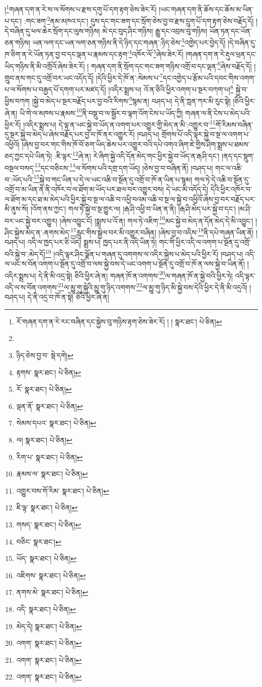 །\footnote{རོ་གཞན་དག་ན་རེ་རང་བཞིན་དང་སྐྱེས་བུ་གཉིས་རྟག་ཅེས་ཟེར་རོ། ། །  སྣར་ཐང་།  པེ་ཅིན། }གཞན་དག་ན་རེ་ས་ལ་སོགས་པ་རྫས་དགུ་པོ་དག་རྟག་ཅེས་ཟེར་རོ། །ཡང་གཞན་དག་ནི་ཆོས་དང་ཆོས་མ་ཡིན་པ་དང་། :གང་ཟག་\footnote{}ནམ་མཁའ་དང་། དུས་དང་གང་ཟག་དང་སྲོག་ཅེས་བྱ་བ་རྫས་དྲུག་པོ་དག་རྟག་ཅེས་བརྗོད་དོ། །དེ་བཞིན་དུ་ཕལ་ཆེར་སྲོག་དང་ལུས་གཉིས། མེ་དང་བུད་ཤིང་གཉིས། རྒྱུ་དང་འབྲས་བུ་གཉིས། ཡོན་ཏན་དང་ཡོན་ཅན་གཉིས། ཡན་ལག་དང་ཡན་ལག་ཅན་གཉིས་ནི་དེ་ཉིད་དང་གཞན་:ཉིད་ཅེས་\footnote{ཉིད་ཅེས་བྱ་བ་  སྡེ་དགེ། }འགྱེད་པར་བྱེད་དོ། །དེ་བཞིན་དུ་ཁ་ཅིག་ན་རེ་ཡོན་ཏན་བྱ་བ་དང་ལྡན་པ་རྣམས་དང་རྟག་\footnote{རྟགས་  སྣར་ཐང་།  པེ་ཅིན། }འཁོར་ལོ་\footnote{རོ་  སྣར་ཐང་།  པེ་ཅིན། }ཞེས་ཟེར་རོ། །གཞན་དག་ན་རེ་རྡུལ་ཕྲན་དང་ཡིད་གཉིས་ནི་མི་འགྲོའོ་ཞེས་ཟེར་རོ། །
གཞན་དག་ནི་སྲོག་དང་གང་ཟག་གཉིས་འགྲོ་བ་དང་ལྡན་\footnote{ལྡན་ནོ་  སྣར་ཐང་།  པེ་ཅིན། }ཞེས་བརྗོད་དོ། །གྲུབ་ནས་གང་དུ་འགྲོ་བར་ཡང་འདོད་དོ། །དེའི་ཕྱིར་དེ་ཁོ་ན་:སེམས་པ་\footnote{སེམས་དཔའ་  སྣར་ཐང་།  པེ་ཅིན། }དང་འགྱེད་པ་རྩོམ་པའི་དབང་གིས་འགག་པ་ལ་སོགས་པ་བརྒྱད་པོ་དགག་པར་མཛད་དོ། །འདིར་སྨྲས་པ། འོ་ན་ཅིའི་ཕྱིར་འགག་པ་སྔར་བཀག་པ།\footnote{ལ།  སྣར་ཐང་།  པེ་ཅིན། } སྐྱེ་བ་ཕྱིས་བཀག །སྐྱེ་བ་མེད་པ་སྔར་བརྗོད་པར་བྱ་བའི་རིགས་\footnote{རིག་པ་  སྣར་ཐང་།  པེ་ཅིན། }སྙམ་ན། བཤད་པ། དེ་ནི་ཀླན་ཀར་མི་རུང་སྟེ། །ཅིའི་ཕྱིར་ཞེ་ན། ཡི་གེ་ལ་མཁས་པ་རྣམས་\footnote{རྣམས་ལ་  སྣར་ཐང་།  པེ་ཅིན། }ནི་བསྡུ་བ་ལ་སྦྱོར་བ་ལྟག་འོག་ངེས་པ་ཡོད་ཀྱི། གཞན་ལ་ནི་ངེས་པ་མེད་པའི་ཕྱིར་རོ། །འདིར་སྨྲས་པ། དེ་ལྟ་ན་ཡང་སྐྱེ་བ་ཡོད་ན་འགག་པར་འགྱུར་གྱི་མེད་ན་མི་:འགྱུར་བ་\footnote{འགྱུར་བས་གོ་རིམ་  སྣར་ཐང་།  པེ་ཅིན། }གོ་རིམས་བཞིན་དུ་སྔར་སྐྱེ་བ་མེད་པ་ཞེས་བརྗོད་པར་བྱ་བ་ཁོ་ནར་འགྱུར་རོ། །བཤད་པ། གྲོགས་པོ་འདི་ལྟར་སྐྱེ་བ་སྔ་ལ་འགག་པ་འཕྱིའོ། །ཞེས་བྱ་བར་གང་གིས་ཁོ་བོ་ཅག་ཡིད་ཆེས་པར་འགྱུར་བའི་དཔེ་འགའ་ཞིག་ཇེ་གྱིས་ཤིག་སྨྲས་པ་ཐམས་ཅད་ཀྱང་དཔེ་ཡིན་ཏེ། :ཇི་ལྟར་\footnote{ཇི་ལྟ་  སྣར་ཐང་།  པེ་ཅིན། }ཞེ་ན། རེ་ཞིག་སྐྱེ་འདི་དོན་མེད་གང་ཕྱིར་སྐྱེ་བ་ཡོད་ན་རྒ་ཤི་དང་། །ནད་དང་སྡུག་བསྔལ་བསད་\footnote{གསད་  སྣར་ཐང་།  པེ་ཅིན། }དང་བཅིངས་\footnote{བཅིང་  སྣར་ཐང་། }ལ་སོགས་པའི་དགྲ་དག་ཡོད། །ཅེས་བྱ་བ་བཞིན་ནོ། །བཤད་པ། གང་ལ་འཆི་བ་:ཡོད་པའི་\footnote{ཡོད་  སྣར་ཐང་།  པེ་ཅིན། }སྐྱེ་བ་གང་ཡིན་པ་དེ་ལ་ཡང་འཆི་བ་སྔོན་དུ་འགྲོ་བ་ཁོ་ན་ཡིན་པ་སྙམ། གལ་ཏེ་དེ་འཆི་བ་སྔོན་དུ་འགྲོ་བ་མ་ཡིན་ན་ནི་འཁོར་བ་ལ་ཐོག་མ་ཡོད་པར་ཐལ་བར་འགྱུར་བས། དེ་ཡང་མི་འདོད་དེ། དེའི་ཕྱིར་འཁོར་བ་ལ་ཐོག་མ་དང་ཐ་མ་མེད་པའི་ཕྱིར་སྐྱེ་བ་སྔ་ལ་འཆི་བ་འཕྱི་བའམ་འཆི་བ་སྔ་ལ་སྐྱེ་བ་འཕྱིའོ་ཞེས་བྱ་བར་བརྗོད་པར་མི་ནུས་སོ། །འོག་ནས་ཀྱང་། གལ་ཏེ་སྐྱེ་བ་སྔ་གྱུར་ལ། །རྒ་ཤི་འཕྱི་བ་ཡིན་ན་ནི། །རྒ་ཤི་མེད་པར་སྐྱེ་བ་དང་། །མ་ཤི་བར་ཡང་སྐྱེ་བར་འགྱུར། །ཞེས་འབྱུང་ངོ། །སྨྲས་པ་འོ་ན། གལ་ཏེ་འཇིག་\footnote{འཇིགས་  སྣར་ཐང་།  པེ་ཅིན། }མང་སྐྱེ་བ་མེད་ན་དོན་མེད་དེ་མི་འབྱུང་། །ཤིང་སྐྱེས་མེད་ན་:ནགས་མེད་\footnote{ནགས་མེ་  སྣར་ཐང་།  པེ་ཅིན། }རླུང་གིས་སྒྱེལ་བར་མི་འགྱུར་བཞིན། །ཞེས་བྱ་བ་འདིས་\footnote{འདི་  སྣར་ཐང་།  པེ་ཅིན། }ནི་དཔེ་གཞན་ཡིན་ནོ། །བཤད་པ། འདི་ལ་ཁྱད་པར་ཅི་ཡོད། སྨྲས་པ། ཁྱད་པར་ནི་འདི་ཡིན་ཏེ། གང་གི་ཕྱིར་འདི་ལ་འགག་པ་སྔོན་དུ་འགྲོ་བའི་སྐྱེ་བ་:མེད་དོ།\footnote{མེད་དེ།  སྣར་ཐང་།  པེ་ཅིན། } །འདི་ལྟར་ཤིང་ལྗོན་པ་གཞན་དུ་འགགས་ལ་འདིར་སྐྱེས་པ་མེད་པའི་ཕྱིར་རོ། །བཤད་པ། འདི་ལ་ཡང་ས་བོན་འགག་པ་སྔོན་དུ་འགྲོ་བ་ལས་སྐྱེ་བས་དེ་ཡང་འགག་པ་སྔོན་དུ་འགྲོ་བ་ཁོ་ན་ལས་སྐྱེ་བ་ཡིན་ནོ། །འདིར་སྨྲས་པ། དེ་ནི་མི་འདྲ་སྟེ། ཅིའི་ཕྱིར་ཞེ་ན། གཞན་ཁོ་ན་འགགས་\footnote{འགག་  སྣར་ཐང་།  པེ་ཅིན། }ལ་གཞན་ཁོ་ན་སྐྱེ་བའི་ཕྱིར་ཏེ། འདི་ལྟར་འདི་ལ་ས་བོན་འགགས་\footnote{འགག་  སྣར་ཐང་།  པེ་ཅིན། }ལ་མྱུ་གུ་སྐྱེའི་མྱུ་གུ་ཉིད་འགགས་\footnote{འགག་  སྣར་ཐང་།  པེ་ཅིན། }ལ་མྱུ་གུ་ཉིད་མི་སྐྱེ་བས་དེའི་ཕྱིར་དེ་ནི་མི་འདྲའོ། །བཤད་པ། དེ་ནི་འདྲ་བ་ཁོ་ན་སྟེ། ཅིའི་ཕྱིར་ཞེ་ན། 